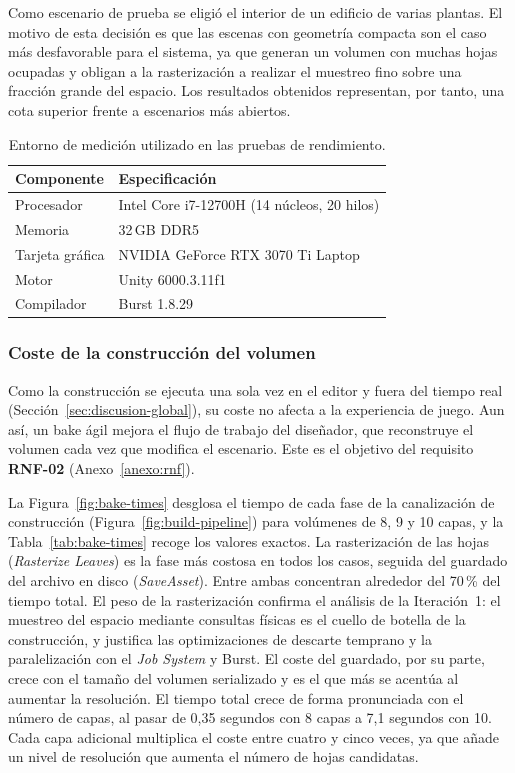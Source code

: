 Como escenario de prueba se eligió el interior de un edificio de varias plantas.
El motivo de esta decisión es que las escenas con geometría compacta son el caso más desfavorable para el sistema, ya que generan un volumen con muchas hojas ocupadas y obligan a la rasterización a realizar el muestreo fino sobre una fracción grande del espacio.
Los resultados obtenidos representan, por tanto, una cota superior frente a escenarios más abiertos.

\begin{table}[htp]
  \centering
  \begin{tabular}{l|l}
  \rowcolor{udcpink!25}
  \textbf{Componente} & \textbf{Especificación} \\\hline
  Procesador & Intel Core i7-12700H (14 núcleos, 20 hilos) \\
  Memoria & 32\,GB DDR5 \\
  Tarjeta gráfica & NVIDIA GeForce RTX 3070 Ti Laptop \\
  Motor & Unity 6000.3.11f1 \\
  Compilador & Burst 1.8.29 \\
  \end{tabular}
  \caption{Entorno de medición utilizado en las pruebas de rendimiento.}
  \label{tab:entorno-medicion}
\end{table}

\subsubsection{Coste de la construcción del volumen}

Como la construcción se ejecuta una sola vez en el editor y fuera del tiempo real (Sección~\ref{sec:discusion-global}), su coste no afecta a la experiencia de juego.
Aun así, un \gls{bake} ágil mejora el flujo de trabajo del diseñador, que reconstruye el volumen cada vez que modifica el escenario.
Este es el objetivo del requisito \textbf{RNF-02} (Anexo~\ref{anexo:rnf}).

La Figura~\ref{fig:bake-times} desglosa el tiempo de cada fase de la canalización de construcción (Figura~\ref{fig:build-pipeline}) para volúmenes de 8, 9 y 10 capas, y la Tabla~\ref{tab:bake-times} recoge los valores exactos.
La rasterización de las hojas (\textit{Rasterize Leaves}) es la fase más costosa en todos los casos, seguida del guardado del archivo en disco (\textit{SaveAsset}). Entre ambas concentran alrededor del 70\,\% del tiempo total.
El peso de la rasterización confirma el análisis de la Iteración~1: el muestreo del espacio mediante consultas físicas es el cuello de botella de la construcción, y justifica las optimizaciones de descarte temprano y la paralelización con el \textit{Job System} y Burst.
El coste del guardado, por su parte, crece con el tamaño del volumen serializado y es el que más se acentúa al aumentar la resolución.
El tiempo total crece de forma pronunciada con el número de capas, al pasar de 0,35 segundos con 8 capas a 7,1 segundos con 10.
Cada capa adicional multiplica el coste entre cuatro y cinco veces, ya que añade un nivel de resolución que aumenta el número de hojas candidatas.

